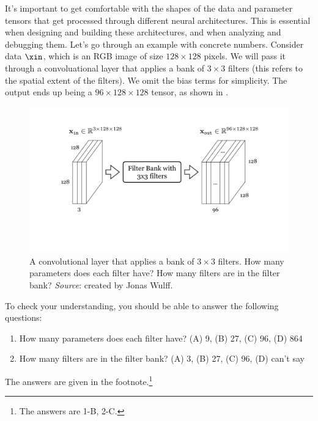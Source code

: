 It's important to get comfortable with the shapes of the data and parameter tensors that get processed through different neural architectures. This is essential when designing and building these architectures, and when analyzing and debugging them. Let's go through an example with concrete numbers. Consider data $\xin$, which is an RGB image of size $128 \times 128$ pixels. We will pass it through a convoluational layer that applies a bank of $3 \times 3$ filters (this refers to the spatial extent of the filters). We omit the bias terms for simplicity. The output ends up being a $96 \times 128 \times 128$ tensor, as shown in \fig{\ref{fig:convolutional_neural_nets:multichannel_conv_diagram}}.
\begin{figure}[h]
    \centerline{
        \includegraphics[width=0.65\linewidth]{./figures/convolutional_neural_nets/multichannel_conv_diagram.pdf}}
    \caption{A convolutional layer that applies a bank of $3 \times 3$ filters. How many parameters does each filter have? How many filters are in the filter bank? \textit{Source}: created by Jonas Wulff.}
    \label{fig:convolutional_neural_nets:multichannel_conv_diagram}
\end{figure}

To check your understanding, you should be able to answer the following questions:
\begin{enumerate}
    \item How many parameters does each filter have? (A) 9, (B) 27, (C) 96, (D) 864
    \item How many filters are in the filter bank? (A) 3, (B) 27, (C) 96, (D) can't say
\end{enumerate}
The answers are given in the footnote.\footnote{The answers are 1-B, 2-C.}



